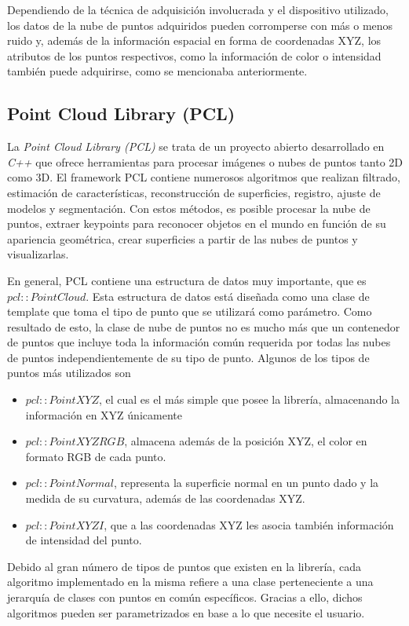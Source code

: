 Dependiendo de la técnica de adquisición involucrada y el dispositivo utilizado, los datos de la nube de puntos adquiridos pueden corromperse con más o menos ruido y, además de la información espacial en forma de coordenadas XYZ, los atributos de los puntos respectivos, como la información de color o intensidad también puede adquirirse, como se mencionaba anteriormente.

\subsection{Point Cloud Library (PCL)}
La \textit{Point Cloud Library (PCL)} se trata de un proyecto abierto desarrollado en \textit{C++} que ofrece herramientas para procesar imágenes o nubes de puntos tanto 2D como 3D. El framework PCL contiene numerosos algoritmos que realizan filtrado, estimación de características, reconstrucción de superficies, registro, ajuste de modelos y segmentación. Con estos métodos, es posible procesar la nube de puntos, extraer keypoints para reconocer objetos en el mundo en función de su apariencia geométrica, crear superficies a partir de las nubes de puntos y visualizarlas.

En general, PCL contiene una estructura de datos muy importante, que es $pcl::PointCloud$. Esta estructura de datos está diseñada como una clase de template que toma el tipo de punto que se utilizará como parámetro. Como resultado de esto, la clase de nube de puntos no es mucho más que un contenedor de puntos que incluye toda la información común requerida por todas las nubes de puntos independientemente de su tipo de punto. Algunos de los tipos de puntos más utilizados son
\begin{itemize}
    \item $pcl::PointXYZ$, el cual es el más simple que posee la librería, almacenando la información en XYZ únicamente
    \item $pcl::PointXYZRGB$, almacena además de la posición XYZ, el color en formato RGB de cada punto.
    \item $pcl::PointNormal$, representa la superficie normal en un punto dado y la medida de su curvatura, además de las coordenadas XYZ.
    \item $pcl::PointXYZI$, que a las coordenadas XYZ les asocia también información de intensidad del punto.
\end{itemize}

Debido al gran número de tipos de puntos que existen en la librería, cada algoritmo implementado en la misma refiere a una clase perteneciente a una jerarquía de clases con puntos en común específicos. Gracias a ello, dichos algoritmos pueden ser parametrizados en base a lo que necesite el usuario. 

